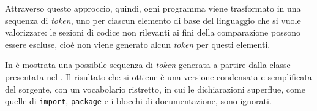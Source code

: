 Attraverso questo approccio, quindi, ogni programma viene trasformato in una sequenza di \textit{token}, uno per ciascun elemento di base del linguaggio che si vuole valorizzare: le sezioni di codice non rilevanti ai fini della comparazione possono essere escluse, cioè non viene generato alcun \textit{token} per questi elementi.

In  è mostrata una possibile sequenza di \textit{token} generata a partire dalla classe presentata nel .
%
Il risultato che si ottiene è una versione condensata e semplificata del sorgente, con un vocabolario ristretto, in cui le dichiarazioni superflue, come quelle di \texttt{import}, \texttt{package} e i blocchi di documentazione, sono ignorati.



